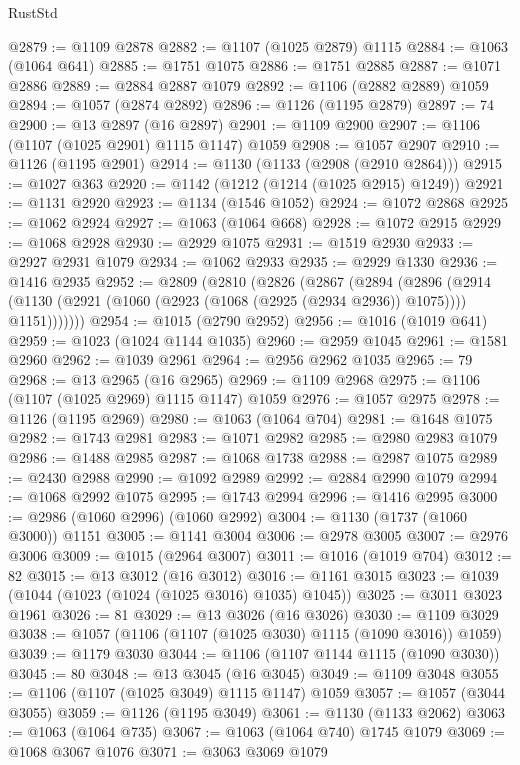 \begin{lexlean}{RustStd}
\begin{coremodule}
{\begin{coremodule}
{{{{{{{{{{{{{{{{{{{{{{{{{{{{{{{{{{{@2879 := @1109 @2878
@2882 := @1107 (@1025 @2879) @1115
@2884 := @1063 (@1064 @641)
@2885 := @1751 @1075
@2886 := @1751 @2885
@2887 := @1071 @2886
@2889 := @2884 @2887 @1079
@2892 := @1106 (@2882 @2889) @1059
@2894 := @1057 (@2874 @2892)
@2896 := @1126 (@1195 @2879)
@2897 := 74
@2900 := @13 @2897 (@16 @2897)
@2901 := @1109 @2900
@2907 := @1106 (@1107 (@1025 @2901) @1115 @1147) @1059
@2908 := @1057 @2907
@2910 := @1126 (@1195 @2901)
@2914 := @1130 (@1133 (@2908 (@2910 @2864)))
@2915 := @1027 @363
@2920 := @1142 (@1212 (@1214 (@1025 @2915) @1249))
@2921 := @1131 @2920
@2923 := @1134 (@1546 @1052)
@2924 := @1072 @2868
@2925 := @1062 @2924
@2927 := @1063 (@1064 @668)
@2928 := @1072 @2915
@2929 := @1068 @2928
@2930 := @2929 @1075
@2931 := @1519 @2930
@2933 := @2927 @2931 @1079
@2934 := @1062 @2933
@2935 := @2929 @1330
@2936 := @1416 @2935
@2952 := @2809
    (@2810
      (@2826
        (@2867
          (@2894
            (@2896
              (@2914 (@1130 (@2921 (@1060 (@2923 (@1068 (@2925 (@2934 @2936)) @1075)))) @1151)))))))
@2954 := @1015 (@2790 @2952)
@2956 := @1016 (@1019 @641)
@2959 := @1023 (@1024 @1144 @1035)
@2960 := @2959 @1045
@2961 := @1581 @2960
@2962 := @1039 @2961
@2964 := @2956 @2962 @1035
@2965 := 79
@2968 := @13 @2965 (@16 @2965)
@2969 := @1109 @2968
@2975 := @1106 (@1107 (@1025 @2969) @1115 @1147) @1059
@2976 := @1057 @2975
@2978 := @1126 (@1195 @2969)
@2980 := @1063 (@1064 @704)
@2981 := @1648 @1075
@2982 := @1743 @2981
@2983 := @1071 @2982
@2985 := @2980 @2983 @1079
@2986 := @1488 @2985
@2987 := @1068 @1738
@2988 := @2987 @1075
@2989 := @2430 @2988
@2990 := @1092 @2989
@2992 := @2884 @2990 @1079
@2994 := @1068 @2992 @1075
@2995 := @1743 @2994
@2996 := @1416 @2995
@3000 := @2986 (@1060 @2996) (@1060 @2992)
@3004 := @1130 (@1737 (@1060 @3000)) @1151
@3005 := @1141 @3004
@3006 := @2978 @3005
@3007 := @2976 @3006
@3009 := @1015 (@2964 @3007)
@3011 := @1016 (@1019 @704)
@3012 := 82
@3015 := @13 @3012 (@16 @3012)
@3016 := @1161 @3015
@3023 := @1039 (@1044 (@1023 (@1024 (@1025 @3016) @1035) @1045))
@3025 := @3011 @3023 @1961
@3026 := 81
@3029 := @13 @3026 (@16 @3026)
@3030 := @1109 @3029
@3038 := @1057 (@1106 (@1107 (@1025 @3030) @1115 (@1090 @3016)) @1059)
@3039 := @1179 @3030
@3044 := @1106 (@1107 @1144 @1115 (@1090 @3030))
@3045 := 80
@3048 := @13 @3045 (@16 @3045)
@3049 := @1109 @3048
@3055 := @1106 (@1107 (@1025 @3049) @1115 @1147) @1059
@3057 := @1057 (@3044 @3055)
@3059 := @1126 (@1195 @3049)
@3061 := @1130 (@1133 @2062)
@3063 := @1063 (@1064 @735)
@3067 := @1063 (@1064 @740) @1745 @1079
@3069 := @1068 @3067 @1076
@3071 := @3063 @3069 @1079
}}}}}}}}}}}}}}}}}}}}}}}}}}}}}}}}}}}
\end{coremodule}}
\end{coremodule}
\end{lexlean}
